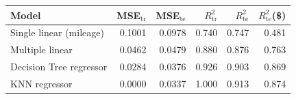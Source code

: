 \begin{tabular}{@{}lrrrrr@{}}
\toprule
Model & MSE$_\mathrm{tr}$ & MSE$_\mathrm{te}$ & $R^2_\mathrm{tr}$ & $R^2_\mathrm{te}$ & $R^2_\mathrm{te}$(\$) \\
\midrule
Single linear (mileage) & 0.1001 & 0.0978 & 0.740 & 0.747 & 0.481 \\
Multiple linear & 0.0462 & 0.0479 & 0.880 & 0.876 & 0.763 \\
Decision Tree regressor & 0.0284 & 0.0376 & 0.926 & 0.903 & 0.869 \\
KNN regressor & 0.0000 & 0.0337 & 1.000 & 0.913 & 0.874 \\
\bottomrule
\end{tabular}

